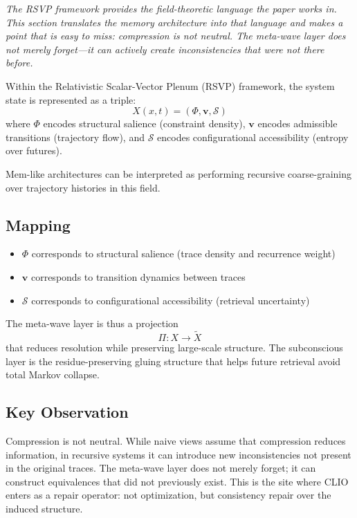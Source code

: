 \documentclass[12pt,a4paper]{article}
\begin{document}
\textit{The RSVP framework provides the field-theoretic language the paper works in. This section translates the memory architecture into that language and makes a point that is easy to miss: compression is not neutral. The meta-wave layer does not merely forget---it can actively create inconsistencies that were not there before.}

Within the Relativistic Scalar-Vector Plenum (RSVP) framework, the system state is represented as a triple:
\[
X(x,t) = (\Phi, \mathbf{v}, \mathcal{S})
\]
where $\Phi$ encodes structural salience (constraint density), $\mathbf{v}$ encodes admissible transitions (trajectory flow), and $\mathcal{S}$ encodes configurational accessibility (entropy over futures).

Mem-like architectures can be interpreted as performing recursive coarse-graining over trajectory histories in this field.

\subsection{Mapping}

\begin{itemize}[noitemsep]
\item $\Phi$ corresponds to structural salience (trace density and recurrence weight)
\item $\mathbf{v}$ corresponds to transition dynamics between traces
\item $\mathcal{S}$ corresponds to configurational accessibility (retrieval uncertainty)
\end{itemize}

The meta-wave layer is thus a projection
\[
\Pi : X \rightarrow \tilde{X}
\]
that reduces resolution while preserving large-scale structure. The subconscious layer is the residue-preserving gluing structure that helps future retrieval avoid total Markov collapse.

\subsection{Key Observation}

Compression is not neutral. While naive views assume that compression reduces information, in recursive systems it can introduce new inconsistencies not present in the original traces. The meta-wave layer does not merely forget; it can construct equivalences that did not previously exist. This is the site where CLIO enters as a repair operator: not optimization, but consistency repair over the induced structure.
\end{document}
